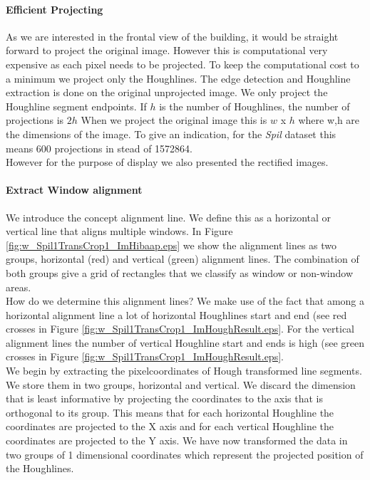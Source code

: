 \paragraph{Efficient Projecting} 
As we are interested in the frontal view of the building, it would be straight
forward to project the original image. However this is computational
very expensive as each pixel needs to be projected. To keep the computational cost to a minimum we project only the
Houghlines. The edge detection and Houghline extraction is done on the original
unprojected image. We only project the Houghline segment
endpoints. If $h$ is the number of Houghlines, the number of projections is $2h$
When we project the original image this is $w$ x $h$ where w,h are the dimensions of
the image. To give an indication, for the \emph{Spil} dataset %
this means 600 projections in stead of 1572864.\\
However for the purpose of display we also presented the rectified images.


\paragraph{Extract Window alignment}
We introduce the concept alignment line. We define this as a horizontal or
vertical line that aligns multiple windows. In Figure
\ref{fig:w_Spil1TransCrop1_ImHibaap.eps}
we show the alignment lines as two groups, horizontal (red) and
vertical (green) alignment lines.  The combination of both groups give a grid of
rectangles that we classify as window or non-window areas.\\

How do we determine this alignment lines? We make use of the fact that among a
horizontal alignment line a lot of horizontal Houghlines start and end (see red
crosses in Figure \ref{fig:w_Spil1TransCrop1_ImHoughResult.eps}. For the vertical alignment lines
the number of vertical Houghline start and ends is high (see green crosses in
Figure \ref{fig:w_Spil1TransCrop1_ImHoughResult.eps}.\\

We begin by extracting the pixelcoordinates of Hough transformed line
segments. We store them in two groups, horizontal and vertical.%
We discard the dimension that is least informative by projecting the coordinates to
the axis that is orthogonal to its group. 
This means that for each horizontal Houghline the coordinates are projected to the X
axis and for each vertical Houghline the coordinates are projected to the Y
axis. We have now transformed the data in two groups of 1 dimensional
coordinates which represent the projected position of the Houghlines.\\

